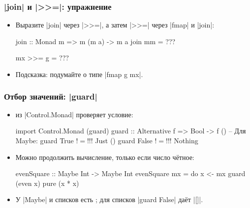 \documentclass[11pt]{beamer}
\begin{document}
\begin{frame}[fragile]
  \frametitle{\haskinline|join| и \haskinline|>>=|: упражнение}
  \begin{itemize}
    \item Выразите \haskinline|join| через \haskinline|>>=|, а затем \haskinline|>>=| через \haskinline|fmap| и \haskinline|join|:
          \begin{haskell}
            join :: Monad m => m (m a) -> m a
            join mm = ???

            mx >>= g = ???
          \end{haskell}
    \item Подсказка: подумайте о типе \haskinline|fmap g mx|.
  \end{itemize}
\end{frame}

\begin{frame}[fragile]
  \frametitle{Отбор значений: \haskinline|guard|}
  \begin{itemize}
    \item \href{https://hackage.haskell.org/package/base/docs/Control-Monad.html#v:guard}{} из \haskinline|Control.Monad| проверяет условие:
          \begin{haskellsmall}
            import Control.Monad (guard)
            guard :: Alternative f => Bool -> f ()
            -- Для Maybe:
            guard True  !$=$!!\pause! Just ()
            guard False !$=$!!\pause! Nothing
          \end{haskellsmall}
    \item Можно продолжить вычисление, только если число чётное:
          \begin{haskellsmall}
            evenSquare :: Maybe Int -> Maybe Int
            evenSquare mx = do
              x <- mx
              guard (even x)
              pure (x * x)
          \end{haskellsmall}
    \item У \haskinline|Maybe| и списков есть \href{https://hackage.haskell.org/package/base/docs/Control-Applicative.html#t:Alternative}{}; для списков \haskinline|guard False| даёт \haskinline|[]|.
  \end{itemize}
\end{frame}
\end{document}
